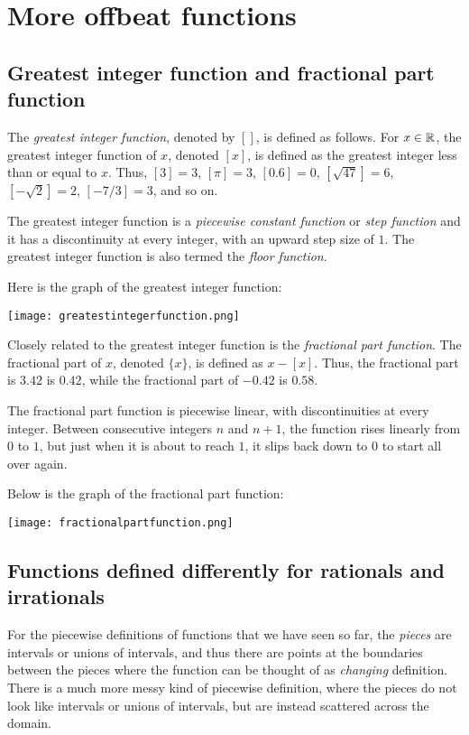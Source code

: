 \documentclass{amsart}
\begin{document}
\section{More offbeat functions}

\subsection{Greatest integer function and fractional part function}

The {\em greatest integer function}, denoted by $[]$, is defined as
follows. For $x \in \mathbb{R}$, the greatest integer function of $x$, denoted
$[x]$, is defined as the greatest integer less than or equal to
$x$. Thus, $[3] = 3$, $[\pi] = 3$, $[0.6] = 0$, $[\sqrt{47}] = 6$,
$[-\sqrt{2}] = 2$, $[-7/3] = 3$, and so on.

The greatest integer function is a {\em piecewise constant function}
or {\em step function} and it has a discontinuity at every integer,
with an upward step size of $1$. The greatest integer function is also
termed the {\em floor function}.

Here is the graph of the greatest integer function:

\texttt{[image: greatestintegerfunction.png]}

Closely related to the greatest integer function is the {\em
fractional part function}. The fractional part of $x$, denoted $\{ x
\}$, is defined as $x - [x]$. Thus, the fractional part is $3.42$ is
$0.42$, while the fractional part of $-0.42$ is $0.58$.

The fractional part function is piecewise linear, with discontinuities
at every integer. Between consecutive integers $n$ and $n + 1$, the
function rises linearly from $0$ to $1$, but just when it is about to
reach $1$, it slips back down to $0$ to start all over again.

Below is the graph of the fractional part function:

\texttt{[image: fractionalpartfunction.png]}

\subsection{Functions defined differently for rationals and irrationals}

For the piecewise definitions of functions that we have seen so far,
the {\em pieces} are intervals or unions of intervals, and thus there
are points at the boundaries between the pieces where the function can
be thought of as {\em changing} definition. There is a much more messy
kind of piecewise definition, where the pieces do not look like
intervals or unions of intervals, but are instead scattered across the
domain.
\end{document}
